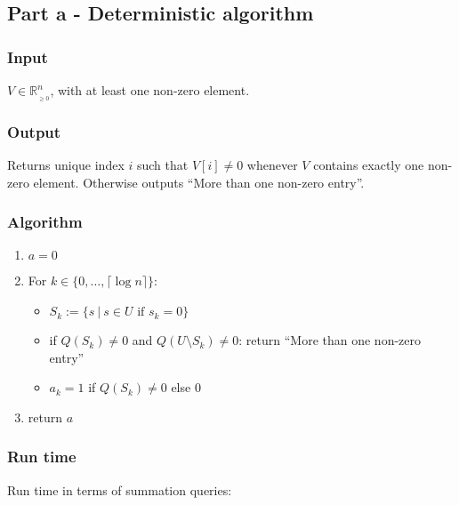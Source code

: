 \subsection*{Part a - Deterministic algorithm}

\subsubsection*{Input}

$V \in \mathbb{R}_{_{\geq 0}}^n$, with at least one non-zero element.

\subsubsection*{Output}

Returns unique index $i$ such that $V[i] \neq 0$ whenever $V$ contains exactly one non-zero element. Otherwise outputs ``More than one non-zero entry''.

\subsubsection*{Algorithm}


\begin{enumerate}
    \item $a = 0$

    \item For $k \in \{0,\dots, \lceil \log n \rceil\}$:

    \begin{itemize}
        \item $S_k := \{s ~ | ~ s \in U \text{ if } s_k = 0 \}$
                
        \item if $Q(S_k) \neq 0$ and $Q(U \setminus S_k) \neq 0$: return ``More than one non-zero entry''
        
        \item $a_k = 1$ if $Q(S_k) \neq 0$ else $0$
        
    \end{itemize}
    
    \item return $a$
\end{enumerate}


\subsubsection*{Run time}

Run time in terms of summation queries:

